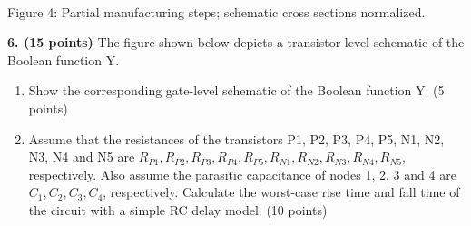 \documentclass[10pt]{article}
\begin{document}
\begin{center}\\Figure 4: Partial manufacturing steps; schematic cross sections normalized.\end{center}
\newpage
\textbf{6. (15 points)} The figure shown below depicts a transistor-level schematic of the Boolean function Y.
\begin{enumerate}[label=(\alph*),leftmargin=7mm]
\item Show the corresponding gate-level schematic of the Boolean function Y. (5 points)
\item Assume that the resistances of the transistors P1, P2, P3, P4, P5, N1, N2, N3, N4 and N5 are $R_{P1},R_{P2},R_{P3},R_{P4},R_{P5},R_{N1},R_{N2},R_{N3},R_{N4},R_{N5}$, respectively. Also assume the parasitic capacitance of nodes 1, 2, 3 and 4 are $C_1,C_2,C_3,C_4$, respectively. Calculate the worst-case rise time and fall time of the circuit with a simple RC delay model. (10 points)
\end{enumerate}
\end{document}
